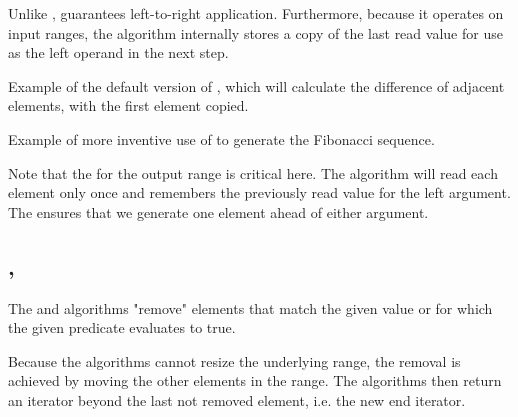 Unlike ,  guarantees left-to-right application. Furthermore, because it operates on input ranges, the algorithm internally stores a copy of the last read value for use as the left operand in the next step.


\begin{box-note}
\footnotesize Example of the default version of , which will calculate the difference of adjacent elements, with the first element copied.
\tcblower
{}
\end{box-note}

\begin{box-note}
\footnotesize Example of more inventive use of  to generate the Fibonacci sequence.
\tcblower
{}
\end{box-note}

Note that the  for the output range is critical here. The  algorithm will read each element only once and remembers the previously read value for the left argument. The  ensures that we generate one element ahead of either argument.

\subsection{\texorpdfstring{, }{\texttt{std::remove}, \texttt{std::remove\_if}}}

The  and  algorithms "remove" elements that match the given value or for which the given predicate evaluates to true.

Because the algorithms cannot resize the underlying range, the removal is achieved by moving the other elements in the range. The algorithms then return an iterator beyond the last not removed element, i.e. the new end iterator.


